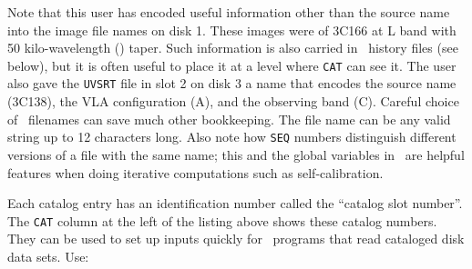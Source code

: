      Note that this user has encoded useful information other than the
source name into the image file names on disk 1.  These images were of
3C166 at L band with 50 kilo-wavelength (\uv) taper.  Such information
is also carried in \AIPS\ history files (see  below), but
it is often useful to place it at a level where {\tt CAT} can see it.
The user also gave the {\tt UVSRT} file in slot 2 on disk 3 a name
that encodes the source name (3C138), the VLA configuration (A), and
the observing band (C). Careful choice of \AIPS\ filenames can save
much other bookkeeping.  The file name can be any valid string up to
12 characters long. Also note how {\tt SEQ} numbers distinguish
different versions of a file with the same name; this and the global
variables in \AIPS\ are helpful features when doing iterative
computations such as self-calibration.


     Each catalog entry has an identification number called the
``catalog slot number''.  The {\tt CAT} column at the left of the
listing above shows these catalog numbers.  They can be used to set up
inputs quickly for \AIPS\ programs that read cataloged disk data sets.
Use:
\btd
{}
\etd
{}
\btd
{}
\etd
{}

\vfill\eject
{}

